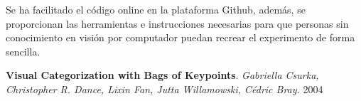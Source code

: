 \documentclass[a4paper,12pt]{article}
\begin{document}



Se ha facilitado el código online en la plataforma Github, además, se 
proporcionan las herramientas e instrucciones necesarias para que personas sin 
conocimiento en visión por computador puedan recrear el experimento de forma
sencilla. 


\newpage
\begin{thebibliography}{99}

 \textbf{Visual Categorization with Bags of Keypoints}. 
 \emph{Gabriella Csurka, Christopher R. Dance, Lixin Fan, Jutta Willamowski, Cédric Bray.}
 2004 

\end{thebibliography}
\end{document}
